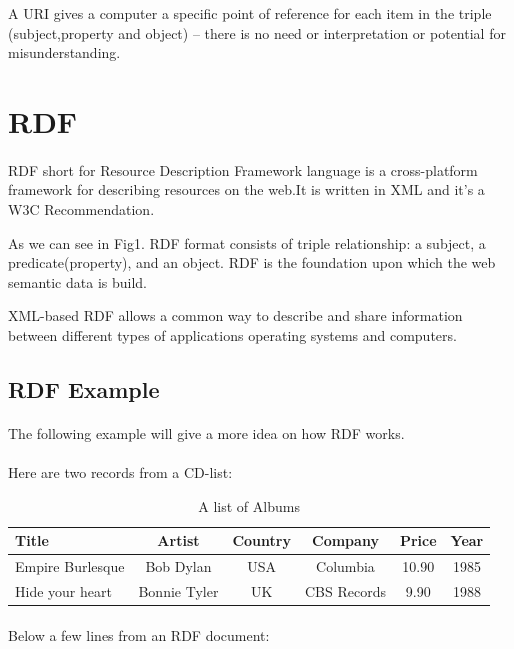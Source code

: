 \documentclass[a4paper,11pt]{report}
\begin{document}
 A URI gives a computer a specific point of reference for each item in the triple (subject,property and object) -- there is no need or interpretation or potential for misunderstanding.

\section{RDF}
\paragraph{}
RDF short for Resource Description Framework language is a  {\color{red}cross-platform framework} for describing resources on the web.It is written in XML and it's a W3C Recommendation.

As we can see in Fig1. RDF format consists of triple relationship: a subject, a predicate(property), and an object. RDF is the foundation upon which the web semantic data is build.

XML-based RDF allows a common way to describe and share information between different types of applications operating systems and computers.
 

\subsection{RDF Example}
\paragraph{}
The following example will give a more idea on how RDF works. \cite{w3schools}
 \paragraph{}
Here are two records from a CD-list:
 
\begin{table}[h]
\centering
\begin{tabular}{ | l | c | c | c | c | c |}
 \hline
 Title & Artist & Country & Company & Price & Year \\ \hline
 Empire Burlesque & Bob Dylan & USA &	Columbia & 10.90 &	1985 \\
 \hline
  Hide your heart & Bonnie Tyler & UK &	CBS Records &9.90 &	1988 \\
 \hline
\end{tabular}
\caption[A list of Albums]{A list of Albums}
\end{table}

\paragraph{}
Below a few lines from an RDF document:
\end{document}
